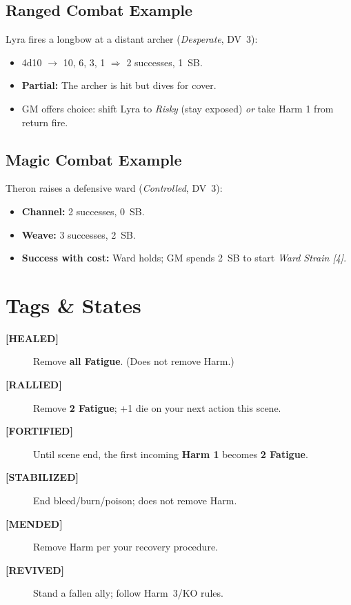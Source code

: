\subsection{Ranged Combat Example}
\label{subsec:ranged-example}
Lyra fires a longbow at a distant archer (\textit{Desperate}, DV~3):
\begin{itemize}
  \item 4d10 $\rightarrow$ 10, 6, 3, 1 $\Rightarrow$ 2 successes, 1~SB.
  \item \textbf{Partial:} The archer is hit but dives for cover.
  \item GM offers choice: shift Lyra to \textit{Risky} (stay exposed) \emph{or} take Harm 1 from return fire.
\end{itemize}

\subsection{Magic Combat Example}
\label{subsec:magic-example}
Theron raises a defensive ward (\textit{Controlled}, DV~3):
\begin{itemize}
  \item \textbf{Channel:} 2 successes, 0~SB.
  \item \textbf{Weave:} 3 successes, 2~SB.
  \item \textbf{Success with cost:} Ward holds; GM spends 2~SB to start \emph{Ward Strain [4]}.
\end{itemize}

\section{Tags \& States}
\label{sec:tags-states-ref}
\begin{description}
  \item[\textbf{[HEALED]}] Remove \textbf{all Fatigue}. (Does not remove Harm.)
  \item[\textbf{[RALLIED]}] Remove \textbf{2 Fatigue}; +1 die on your next action this scene.
  \item[\textbf{[FORTIFIED]}] Until scene end, the first incoming \textbf{Harm 1} becomes \textbf{2 Fatigue}.
  \item[\textbf{[STABILIZED]}] End bleed/burn/poison; does not remove Harm.
  \item[\textbf{[MENDED]}] Remove Harm per your recovery procedure.
  \item[\textbf{[REVIVED]}] Stand a fallen ally; follow Harm~3/KO rules.
\end{description}